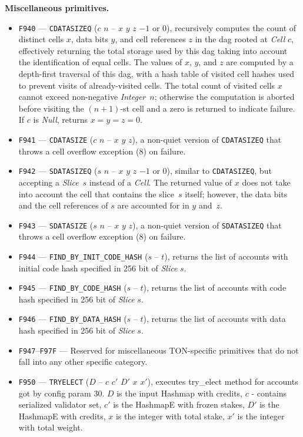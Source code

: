 \documentclass[12pt,oneside]{article}
\def\makepoint#1{\medbreak\noindent{\bf #1.\ }}
\def\nxsubpoint{\refstepcounter{subsubsection}%
  \smallbreak\makepoint{\thesubsubsection}}
\def\emb#1{\textbf{#1.}}
\begin{document}
\nxsubpoint\emb{Miscellaneous primitives}
\begin{itemize}
\item {\tt F940} --- {\tt CDATASIZEQ} ($c$ $n$ -- $x$ $y$ $z$ $-1$ or $0$), recursively computes the count of distinct cells $x$, data bits $y$, and cell references $z$ in the dag rooted at {\em Cell\/} $c$, effectively returning the total storage used by this dag taking into account the identification of equal cells. The values of $x$, $y$, and $z$ are computed by a depth-first traversal of this dag, with a hash table of visited cell hashes used to prevent visits of already-visited cells. The total count of visited cells $x$ cannot exceed non-negative {\em Integer\/}~$n$; otherwise the computation is aborted before visiting the $(n+1)$-st cell and a zero is returned to indicate failure. If $c$ is {\em Null}, returns $x=y=z=0$.
\item {\tt F941} --- {\tt CDATASIZE} ($c$ $n$ -- $x$ $y$ $z$), a non-quiet version of {\tt CDATASIZEQ} that throws a cell overflow exception (8) on failure.
\item {\tt F942} --- {\tt SDATASIZEQ} ($s$ $n$ -- $x$ $y$ $z$ $-1$ or $0$), similar to {\tt CDATASIZEQ}, but accepting a {\em Slice\/}~$s$ instead of a {\em Cell\/}. The returned value of $x$ does not take into account the cell that contains the slice~$s$ itself; however, the data bits and the cell references of $s$ are accounted for in $y$ and~$z$.
\item {\tt F943} --- {\tt SDATASIZE} ($s$ $n$ -- $x$ $y$ $z$), a non-quiet version of {\tt SDATASIZEQ} that throws a cell overflow exception (8) on failure.
\item {\tt F944} --- {\tt FIND\_BY\_INIT\_CODE\_HASH} ($s$ -- $t$), returns the list of accounts with initial code hash specified in 256 bit of {\em Slice\/} $s$.
\item {\tt F945} --- {\tt FIND\_BY\_CODE\_HASH} ($s$ -- $t$), returns the list of accounts with code hash specified in 256 bit of {\em Slice\/} $s$.
\item {\tt F946} --- {\tt FIND\_BY\_DATA\_HASH} ($s$ -- $t$), returns the list of accounts with data hash specified in 256 bit of {\em Slice\/} $s$.
\item {\tt F947}--{\tt F97F} --- Reserved for miscellaneous TON-specific primitives that do not fall into any other specific category.
\item {\tt F950} --- {\tt TRYELECT} ($D$ -- $c$ $c'$ $D'$ $x$ $x'$), executes try\_elect method for accounts got by config param 30. $D$ is the input Hashmap with credits, $c$ - contains serialized validator set, $c'$ is the HashmapE with frozen stakes, $D'$ is the HashmapE with credits, $x$ is the integer with total stake, $x'$ is the integer with total weight.
\end{itemize}
\end{document}
